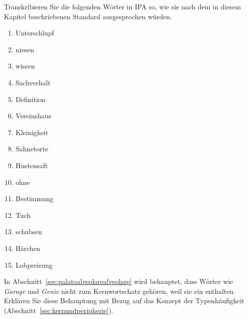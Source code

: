 \Uebung \label{u33} Transkribieren Sie die folgenden Wörter in IPA so, wie sie nach dem in diesem Kapitel beschriebenen Standard ausgesprochen würden.

\begin{enumerate}\Lf
  \item Unterschlupf
  \item niesen
  \item wissen
  \item Sachverhalt
  \item Definition
  \item Vereinshaus
  \item Kleinigkeit
  \item Sahnetorte
  \item Hustensaft
  \item ohne
  \item Bestimmung
  \item Tuch
  \item schubsen
  \item Bärchen
  \item Lobpreisung
\end{enumerate}

\Uebung[\tristar] \label{u34} In Abschnitt~\ref{sec:palatoalveolarealveolare} wird behauptet, dass Wörter wie \textit{Garage} und \textit{Genie} nicht zum Kernwortschatz gehören, weil sie ein \textipa{[Z]} enthalten.
Erklären Sie diese Behauptung mit Bezug auf das Konzept der Typenhäufigkeit (Abschnitt~\ref{sec:kernundperipherie}).
